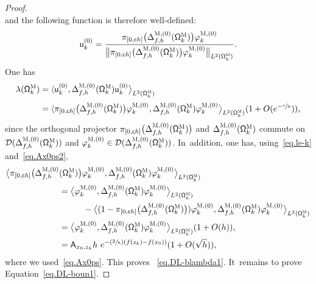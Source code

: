 \documentclass[JEP,XML,SOM,Unicode,NoEqCountersInSection,NoFloatCountersInSection,published]{cedram}
\newcommand{\Psfrac}[2]{(\sfrac{#1}{#2})}
\theoremstyle{plain}
\theoremstyle{definition}
\begin{document}
\begin{proof}
\begin{equation}
\end{equation}
and the following function is therefore well-defined:
\begin{equation}
\label{eq.QMK0=}
\mathsf u^{(0)}_k= \frac{ \pi_{[0,\mathsf ch ]}\bigl(\Delta_{f,h}^{\textsc{M},(0)} (\mathsf \Omega_k^{\textsc{M}})\bigr) \varphi^{\textsc{M},(0)}_k}{ \bigl\Vert\pi_{[0,\mathsf ch ]}\bigl(\Delta_{f,h}^{\textsc{M},(0)} (\mathsf \Omega_k^{\textsc{M}})\bigr) \varphi^{\textsc{M},(0)}_k \bigr\Vert_{L^2(\mathsf \Omega_k^{\textsc{M}})} }.
\end{equation}
One has
\begin{align}
\label{eq.lambdak-O=}
\lambda(\mathsf \Omega_k^{\textsc{M}})&= \langle \mathsf u^{(0)}_k, \Delta_{f,h}^{\textsc{M},(0)} (\mathsf \Omega_k^{\textsc{M}}) \mathsf u^{(0)}_k \big \rangle_{ L^2(\mathsf \Omega_k^{\textsc{M}})}\notag\\[-4pt]
\\[-10pt]
\nonumber
&= \langle \pi_{[0,\mathsf ch ]}\bigl(\Delta_{f,h}^{\textsc{M},(0)} (\mathsf \Omega_k^{\textsc{M}})\bigr) \varphi^{\textsc{M},(0)}_k, \Delta_{f,h}^{\textsc{M},(0)} (\mathsf \Omega_k^{\textsc{M}}) \varphi^{\textsc{M},(0)}_k \big \rangle_{ L^2(\mathsf \Omega_k^{\textsc{M}})} (1+O(e^{-\sfrac ch})),
\end{align}
since the orthogonal projector $\pi_{[0,\mathsf ch ]}\bigl(\Delta_{f,h}^{\textsc{M},(0)} (\mathsf \Omega_k^{\textsc{M}})\bigr) $ and $\Delta_{f,h}^{\textsc{M},(0)} (\mathsf \Omega_k^{\textsc{M}})$ commute on $\mathcal D(\Delta_{f,h}^{\textsc{M},(0)} (\mathsf \Omega_k^{\textsc{M}}))$ and $\varphi^{\textsc{M},(0)}_k \in \mathcal D(\Delta_{f,h}^{\textsc{M}, (0)}(\mathsf \Omega_k^{\textsc{M}}))$. In~addition, one has, using~\eqref{eq.le-k} and~\eqref{eq.Ax0ps2},
\begin{align*}
\bigl\langle \pi_{[0,\mathsf ch ]}\bigl(\Delta_{f,h}^{\textsc{M},(0)}& (\mathsf \Omega_k^{\textsc{M}})\bigr) \varphi^{\textsc{M},(0)}_k, \Delta_{f,h}^{\textsc{M},(0)} (\mathsf \Omega_k^{\textsc{M}}) \varphi^{\textsc{M},(0)}_k \bigr \rangle_{ L^2(\mathsf \Omega_k^{\textsc{M}})} \\
&= \bigl\langle \varphi^{\textsc{M},(0)}_k,
\Delta_{f,h}^{\textsc{M},(0)} (\mathsf \Omega_k^{\textsc{M}}) \varphi^{\textsc{M},(0)}_k \bigr \rangle_{ L^2(\mathsf \Omega_k^{\textsc{M}})} \\
& \hspace*{1cm} - \bigl\langle (1-\pi_{[0,\mathsf ch ]}\bigl(\Delta_{f,h}^{\textsc{M},(0)} (\mathsf \Omega_k^{\textsc{M}})\bigr)) \varphi^{\textsc{M},(0)}_k, \Delta_{f,h}^{\textsc{M},(0)} (\mathsf \Omega_k^{\textsc{M}}) \varphi^{\textsc{M},(0)}_k \bigr \rangle_{ L^2(\mathsf \Omega_k^{\textsc{M}})}\\
&=\bigl\langle \varphi^{\textsc{M},(0)}_k, \Delta_{f,h}^{\textsc{M},(0)} (\mathsf \Omega_k^{\textsc{M}}) \varphi^{\textsc{M},(0)}_k \big \rangle_{ L^2(\mathsf \Omega_k^{\textsc{M}})} (1+O(h)),\\
&= \mathsf A_{x_0,z_k} h \ e^{-\Psfrac 2h (f(z_k)-f(x_0))} (1+O(\sqrt h)),
\end{align*}
where we used~\eqref{eq.Ax0ps}. This proves
~\eqref{eq.DL-blambda1}. It~remains to prove Equation~\eqref{eq.DL-boun1}.


\end{proof}
\end{document}
